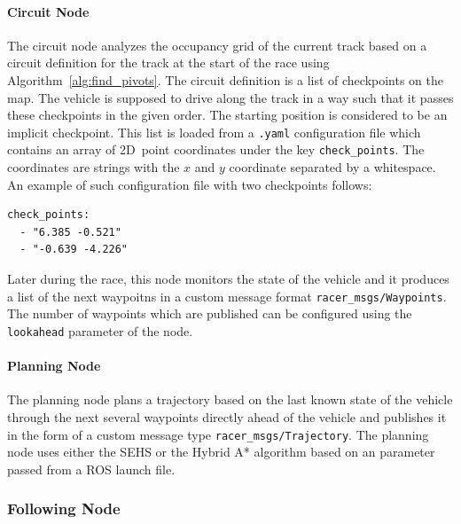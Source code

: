 \paragraph{Circuit Node}

The circuit node analyzes the occupancy grid of the current track based on a circuit definition for the track at the start of the race using Algorithm~\ref{alg:find_pivots}. The circuit definition is a list of checkpoints on the map. The vehicle is supposed to drive along the track in a way such that it passes these checkpoints in the given order. The starting position is considered to be an implicit checkpoint. This list is loaded from a \verb|.yaml| configuration file which contains an array of 2D~point coordinates under the key \verb|check_points|. The coordinates are strings with the $x$ and $y$ coordinate separated by a whitespace. An example of such configuration file with two checkpoints follows:

\begin{verbatim}
check_points:
  - "6.385 -0.521"
  - "-0.639 -4.226"
\end{verbatim} 

Later during the race, this node monitors the state of the vehicle and it produces a list of the next waypoitns in a custom message format
\texttt{racer\_msgs/\allowbreak Waypoints}. The number of waypoints which are published can be configured using the \texttt{lookahead} parameter of the node.

\paragraph{Planning Node}

The planning node plans a trajectory based on the last known state of the vehicle through the next several waypoints directly ahead of the vehicle and publishes it in the form of a custom message type \texttt{racer\_msgs/\-Trajectory}. The planning node uses either the \gls*{SEHS} or the Hybrid A* algorithm based on an parameter passed from a \gls*{ROS} launch file.

\subsubsection{Following Node}

